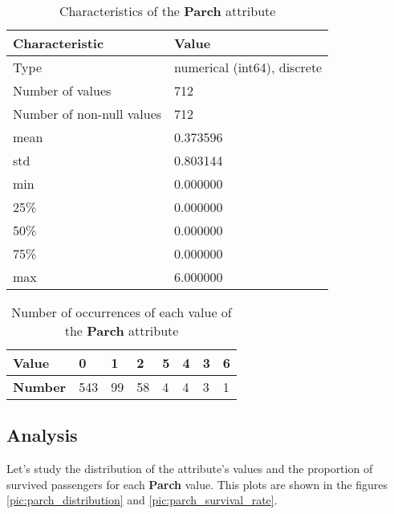\begin{table}[!hp]
    \centering
    \caption{Characteristics of the \textbf{Parch} attribute}
    \begin{tabular}{|l|l|}
        \hline
        \textbf{Characteristic}   & \textbf{Value}              \\ \hline
        Type                      & numerical (int64), discrete \\ \hline
        Number of values          & 712                         \\ \hline
        Number of non-null values & 712                         \\ \hline
        mean                      & 0.373596                    \\ \hline
        std                       & 0.803144                    \\ \hline
        min                       & 0.000000                    \\ \hline
        25\%                      & 0.000000                    \\ \hline
        50\%                      & 0.000000                    \\ \hline
        75\%                      & 0.000000                    \\ \hline
        max                       & 6.000000                    \\ \hline
    \end{tabular}
    \label{table:parch_characteristics}
\end{table}

\begin{table}[!hp]
    \centering
    \caption{Number of occurrences of each value of the \textbf{Parch} 
             attribute}
    \begin{tabular}{|l|l|l|l|l|l|l|l|}
        \hline
        \textbf{Value}  & 0   & 1  & 2  & 5 & 4 & 3 & 6 \\ \hline
        \textbf{Number} & 543 & 99 & 58 & 4 & 4 & 3 & 1 \\ \hline
    \end{tabular}
    \label{table:parch_value_counts}
\end{table}

\subsection{Analysis}
Let's study the distribution of the attribute's values and the proportion 
of survived passengers for each \textbf{Parch} value. This plots are shown
in the figures \ref{pic:parch_distribution} and \ref{pic:parch_survival_rate}.

